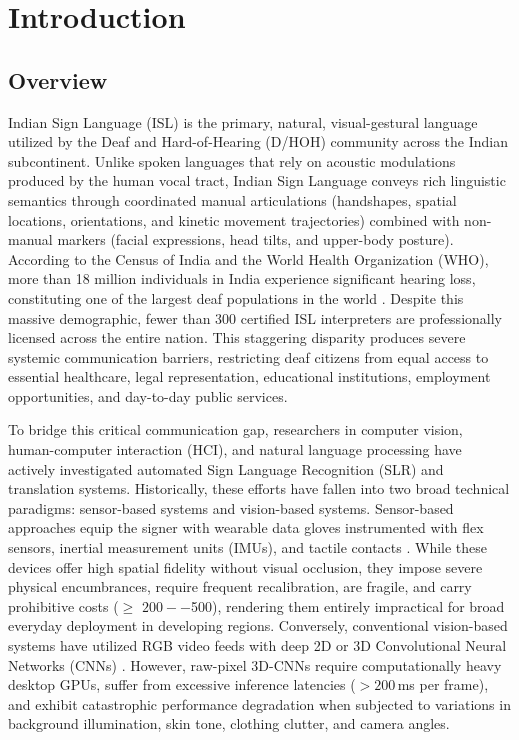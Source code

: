 \chapter{Introduction}
\section{Overview}

Indian Sign Language (ISL) is the primary, natural, visual-gestural language utilized by the Deaf and Hard-of-Hearing (D/HOH) community across the Indian subcontinent. Unlike spoken languages that rely on acoustic modulations produced by the human vocal tract, Indian Sign Language conveys rich linguistic semantics through coordinated manual articulations (handshapes, spatial locations, orientations, and kinetic movement trajectories) combined with non-manual markers (facial expressions, head tilts, and upper-body posture). According to the Census of India and the World Health Organization (WHO), more than 18 million individuals in India experience significant hearing loss, constituting one of the largest deaf populations in the world \cite{14}. Despite this massive demographic, fewer than 300 certified ISL interpreters are professionally licensed across the entire nation. This staggering disparity produces severe systemic communication barriers, restricting deaf citizens from equal access to essential healthcare, legal representation, educational institutions, employment opportunities, and day-to-day public services.

To bridge this critical communication gap, researchers in computer vision, human-computer interaction (HCI), and natural language processing have actively investigated automated Sign Language Recognition (SLR) and translation systems. Historically, these efforts have fallen into two broad technical paradigms: sensor-based systems and vision-based systems. Sensor-based approaches equip the signer with wearable data gloves instrumented with flex sensors, inertial measurement units (IMUs), and tactile contacts \cite{8,16}. While these devices offer high spatial fidelity without visual occlusion, they impose severe physical encumbrances, require frequent recalibration, are fragile, and carry prohibitive costs ($\geq$ $200--$500), rendering them entirely impractical for broad everyday deployment in developing regions. Conversely, conventional vision-based systems have utilized RGB video feeds with deep 2D or 3D Convolutional Neural Networks (CNNs) \cite{9,23}. However, raw-pixel 3D-CNNs require computationally heavy desktop GPUs, suffer from excessive inference latencies ($>200$\,ms per frame), and exhibit catastrophic performance degradation when subjected to variations in background illumination, skin tone, clothing clutter, and camera angles.

